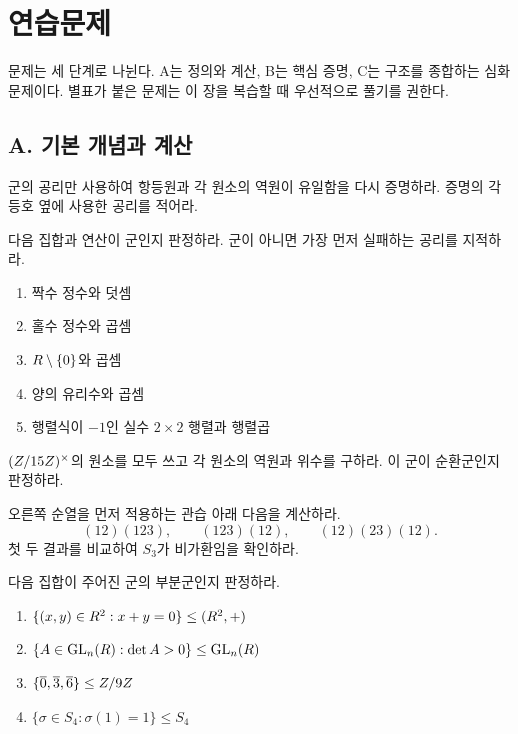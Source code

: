 \section{연습문제}
\label{sec:group-exercises}

문제는 세 단계로 나뉜다. A는 정의와 계산, B는 핵심 증명, C는 구조를 종합하는 심화 문제이다. 별표가 붙은 문제는 이 장을 복습할 때 우선적으로 풀기를 권한다.

\subsection*{A. 기본 개념과 계산}

\begin{exercise}
군의 공리만 사용하여 항등원과 각 원소의 역원이 유일함을 다시 증명하라. 증명의 각 등호 옆에 사용한 공리를 적어라.
\end{exercise}

\begin{exercise}[군 판정]
다음 집합과 연산이 군인지 판정하라. 군이 아니면 가장 먼저 실패하는 공리를 지적하라.
\begin{enumerate}[label=(\alph*)]
  \item 짝수 정수와 덧셈
  \item 홀수 정수와 곱셈
  \item $R\setminus\{0\}$와 곱셈
  \item 양의 유리수와 곱셈
  \item 행렬식이 $-1$인 실수 $2\times2$ 행렬과 행렬곱
\end{enumerate}
\end{exercise}

\begin{exercise}[$(\Z/15\Z)^\times$]
$(\Z/15\Z)^\times$의 원소를 모두 쓰고 각 원소의 역원과 위수를 구하라. 이 군이 순환군인지 판정하라.
\end{exercise}

\begin{exercise}[$S_3$의 계산 $\star$]
오른쪽 순열을 먼저 적용하는 관습 아래 다음을 계산하라.
\[
  (12)(123),\qquad (123)(12),\qquad (12)(23)(12).
\]
첫 두 결과를 비교하여 $S_3$가 비가환임을 확인하라.
\end{exercise}

\begin{exercise}[부분군 판정]
다음 집합이 주어진 군의 부분군인지 판정하라.
\begin{enumerate}[label=(\alph*)]
  \item $\{(x,y)\in R^2:x+y=0\}\le(R^2,+)$
  \item $\{A\in\operatorname{GL}_n(R):\det A>0\}\le\operatorname{GL}_n(R)$
  \item $\{\overline0,\overline3,\overline6\}\le Z/9Z$
  \item $\{\sigma\in S_4:\sigma(1)=1\}\le S_4$
\end{enumerate}
\end{exercise}

